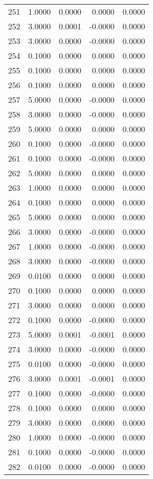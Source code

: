 \begin{longtable}{lrrrr}
251 & 1.0000 & 0.0000 & 0.0000 & 0.0000 \\
252 & 3.0000 & 0.0001 & -0.0000 & 0.0000 \\
253 & 3.0000 & 0.0000 & -0.0000 & 0.0000 \\
254 & 0.1000 & 0.0000 & 0.0000 & 0.0000 \\
255 & 0.1000 & 0.0000 & 0.0000 & 0.0000 \\
256 & 0.1000 & 0.0000 & 0.0000 & 0.0000 \\
257 & 5.0000 & 0.0000 & -0.0000 & 0.0000 \\
258 & 3.0000 & 0.0000 & -0.0000 & 0.0000 \\
259 & 5.0000 & 0.0000 & 0.0000 & 0.0000 \\
260 & 0.1000 & 0.0000 & -0.0000 & 0.0000 \\
261 & 0.1000 & 0.0000 & -0.0000 & 0.0000 \\
262 & 5.0000 & 0.0000 & 0.0000 & 0.0000 \\
263 & 1.0000 & 0.0000 & 0.0000 & 0.0000 \\
264 & 0.1000 & 0.0000 & 0.0000 & 0.0000 \\
265 & 5.0000 & 0.0000 & 0.0000 & 0.0000 \\
266 & 3.0000 & 0.0000 & -0.0000 & 0.0000 \\
267 & 1.0000 & 0.0000 & -0.0000 & 0.0000 \\
268 & 3.0000 & 0.0000 & -0.0000 & 0.0000 \\
269 & 0.0100 & 0.0000 & 0.0000 & 0.0000 \\
270 & 0.1000 & 0.0000 & 0.0000 & 0.0000 \\
271 & 3.0000 & 0.0000 & 0.0000 & 0.0000 \\
272 & 0.1000 & 0.0000 & -0.0000 & 0.0000 \\
273 & 5.0000 & 0.0001 & -0.0001 & 0.0000 \\
274 & 3.0000 & 0.0000 & -0.0000 & 0.0000 \\
275 & 0.0100 & 0.0000 & -0.0000 & 0.0000 \\
276 & 3.0000 & 0.0001 & -0.0001 & 0.0000 \\
277 & 0.1000 & 0.0000 & -0.0000 & 0.0000 \\
278 & 0.1000 & 0.0000 & 0.0000 & 0.0000 \\
279 & 3.0000 & 0.0000 & 0.0000 & 0.0000 \\
280 & 1.0000 & 0.0000 & -0.0000 & 0.0000 \\
281 & 0.1000 & 0.0000 & -0.0000 & 0.0000 \\
282 & 0.0100 & 0.0000 & -0.0000 & 0.0000 \\

\end{longtable}
